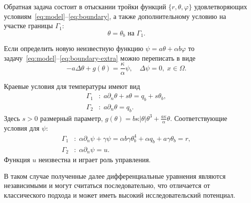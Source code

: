 Обратная задача состоит в отыскании тройки функций $\{r, \theta, \varphi\}$
удовлетворяющих условиям~\eqref{eq:model}--\eqref{eq:boundary}, а также дополнительному условию
на участке границы $\Gamma_1$:
\begin{equation}
    \label{eq:boundary-extra}
    \theta = \theta_b \text{ на } \Gamma_1.
\end{equation}


Если определить новую неизвестную функцию $\psi = a\theta + \alpha b \varphi$ то
задачу~\eqref{eq:model}--\eqref{eq:boundary-extra} можно переписать в виде
\begin{equation}
    \label{eq:model-psi}
    - a \Delta \theta + g (\theta) = \frac{\kappa}{\alpha}\psi, \quad
    \Delta \psi = 0, \; x \in \Omega.
\end{equation}

Краевые условия для температуры имеют вид
\begin{equation}
    \label{eq:boundary-psi-1}
    \begin{aligned}
        \Gamma_1 &: \; a \partial_n \theta + s \theta = q_b + s \theta_b,\\
        \Gamma_2 &: \;  a \partial_n \theta = q_b.
    \end{aligned}
\end{equation}
Здесь $s > 0$ размерный параметр, $g(\theta) = b \kappa|\theta|\theta^3 + \frac{a\kappa}{\alpha}\theta$.
Соответствующие условия для $\psi$:
\begin{equation}
    \label{eq:boundary-psi-2}
    \begin{aligned}
        \Gamma_1 &: \; \alpha \partial_n \psi + \gamma \psi
        = \alpha b \gamma \theta_b^4
        + \alpha q_b + a \gamma \theta_b = r, \\
        \Gamma_2 &: \; \alpha \partial_n \psi = u.
    \end{aligned}
\end{equation}
Функция $u$ неизвестна и играет роль управления.

В таком случае полученные далее дифференциальные уравнения являются независимыми и
могут считаться последовательно,
что отличается от классического подхода и может иметь высокий исследовательский потенциал.

